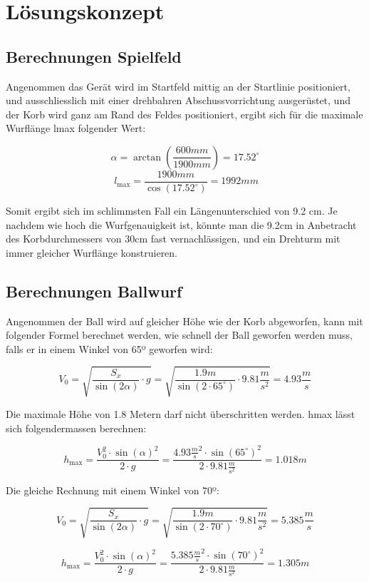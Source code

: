 \section{Lösungskonzept}

\subsection{Berechnungen Spielfeld}

Angenommen das Gerät wird im Startfeld mittig an der Startlinie positioniert, und ausschliesslich mit einer drehbahren Abschussvorrichtung ausgerüstet, und der Korb wird ganz am Rand des Feldes positioniert, ergibt sich für die maximale Wurflänge lmax folgender Wert: 
 
\[\alpha = \arctan( \frac{600mm}{1900mm}) = 17.52^\circ \]
\[\ l_\text{max} = \frac{1900mm}{\cos( 17.52^\circ)} = 1992mm \]

Somit ergibt sich im schlimmsten Fall ein Längenunterschied von 9.2 cm. Je nachdem wie hoch die Wurfgenauigkeit ist, könnte man die 9.2cm in Anbetracht des Korbdurchmessers von 30cm fast vernachlässigen, und ein Drehturm mit immer gleicher Wurflänge konstruieren.

\subsection{Berechnungen Ballwurf}

Angenommen der Ball wird auf gleicher Höhe wie der Korb abgeworfen, kann mit folgender Formel berechnet werden, wie schnell der Ball geworfen werden muss, falls er in einem Winkel von 65º geworfen wird:

\[ V_0 = \sqrt{ \frac{S_x}{\sin(2\alpha)} \cdot g } = \sqrt{ \frac{1.9m}{\sin(2 \cdot 65^\circ)} \cdot 9.81 \frac{m}{s^2}} = 4.93 \frac{m}{s} \]

Die maximale Höhe von 1.8 Metern darf nicht überschritten werden. hmax lässt sich folgendermassen berechnen:

\[ h_\text{max} = \frac{V_0^2 \cdot \sin(\alpha)^2}{2 \cdot g} = \frac{4.93 \frac{m}{s}^2 \cdot \sin(65^\circ)^2}{2 \cdot 9.81 \frac{m}{s^2}} = 1.018m \]

Die gleiche Rechnung mit einem Winkel von 70º:

\[ V_0 = \sqrt{ \frac{S_x}{\sin(2\alpha)} \cdot g } = \sqrt{ \frac{1.9m}{\sin(2 \cdot 70^\circ)} \cdot 9.81 \frac{m}{s^2}} = 5.385 \frac{m}{s} \]

\[ h_\text{max} = \frac{V_0^2 \cdot \sin(\alpha)^2}{2 \cdot g} = \frac{5.385 \frac{m}{s}^2 \cdot \sin(70^\circ)^2}{2 \cdot 9.81 \frac{m}{s^2}} = 1.305m \]